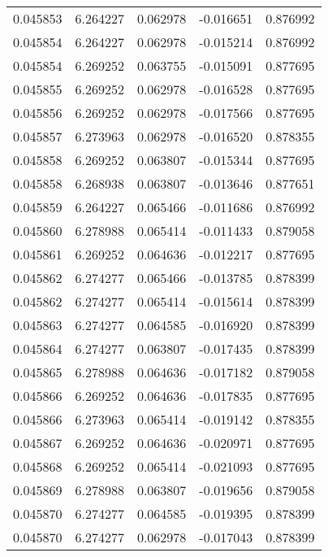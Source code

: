 \begin{tabular}{lrrrr}
0.045853    &  6.264227 &  0.062978 & -0.016651 &             0.876992 \\
0.045854    &  6.264227 &  0.062978 & -0.015214 &             0.876992 \\
0.045854    &  6.269252 &  0.063755 & -0.015091 &             0.877695 \\
0.045855    &  6.269252 &  0.062978 & -0.016528 &             0.877695 \\
0.045856    &  6.269252 &  0.062978 & -0.017566 &             0.877695 \\
0.045857    &  6.273963 &  0.062978 & -0.016520 &             0.878355 \\
0.045858    &  6.269252 &  0.063807 & -0.015344 &             0.877695 \\
0.045858    &  6.268938 &  0.063807 & -0.013646 &             0.877651 \\
0.045859    &  6.264227 &  0.065466 & -0.011686 &             0.876992 \\
0.045860    &  6.278988 &  0.065414 & -0.011433 &             0.879058 \\
0.045861    &  6.269252 &  0.064636 & -0.012217 &             0.877695 \\
0.045862    &  6.274277 &  0.065466 & -0.013785 &             0.878399 \\
0.045862    &  6.274277 &  0.065414 & -0.015614 &             0.878399 \\
0.045863    &  6.274277 &  0.064585 & -0.016920 &             0.878399 \\
0.045864    &  6.274277 &  0.063807 & -0.017435 &             0.878399 \\
0.045865    &  6.278988 &  0.064636 & -0.017182 &             0.879058 \\
0.045866    &  6.269252 &  0.064636 & -0.017835 &             0.877695 \\
0.045866    &  6.273963 &  0.065414 & -0.019142 &             0.878355 \\
0.045867    &  6.269252 &  0.064636 & -0.020971 &             0.877695 \\
0.045868    &  6.269252 &  0.065414 & -0.021093 &             0.877695 \\
0.045869    &  6.278988 &  0.063807 & -0.019656 &             0.879058 \\
0.045870    &  6.274277 &  0.064585 & -0.019395 &             0.878399 \\
0.045870    &  6.274277 &  0.062978 & -0.017043 &             0.878399 \\

\end{tabular}
